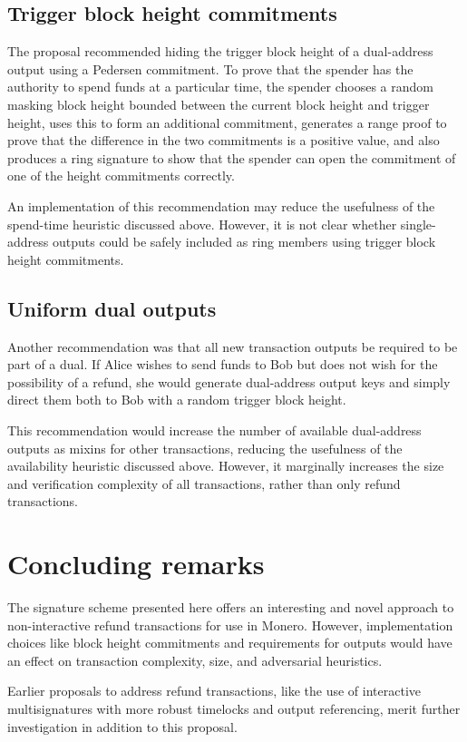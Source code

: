 \documentclass{mrl}
\begin{document}
\subsection{Trigger block height commitments}
The proposal recommended hiding the trigger block height of a dual-address output using a Pedersen commitment. To prove that the spender has the authority to spend funds at a particular time, the spender chooses a random masking block height bounded between the current block height and trigger height, uses this to form an additional commitment, generates a range proof to prove that the difference in the two commitments is a positive value, and also produces a ring signature to show that the spender can open the commitment of one of the height commitments correctly.

An implementation of this recommendation may reduce the usefulness of the spend-time heuristic discussed above. However, it is not clear whether single-address outputs could be safely included as ring members using trigger block height commitments.

\subsection{Uniform dual outputs}
Another recommendation was that all new transaction outputs be required to be part of a dual. If Alice wishes to send funds to Bob but does not wish for the possibility of a refund, she would generate dual-address output keys and simply direct them both to Bob with a random trigger block height.

This recommendation would increase the number of available dual-address outputs as mixins for other transactions, reducing the usefulness of the availability heuristic discussed above. However, it marginally increases the size and verification complexity of all transactions, rather than only refund transactions.

\section{Concluding remarks}
The signature scheme presented here offers an interesting and novel approach to non-interactive refund transactions for use in Monero. However, implementation choices like block height commitments and requirements for outputs would have an effect on transaction complexity, size, and adversarial heuristics.

Earlier proposals to address refund transactions, like the use of interactive multisignatures with more robust timelocks and output referencing, merit further investigation in addition to this proposal.



\end{document}
